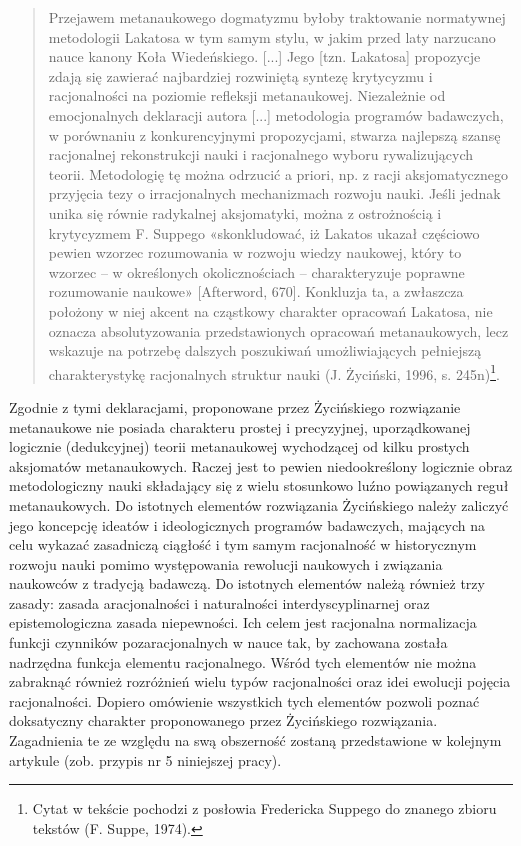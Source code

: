 \documentclass{article}
\begin{document}
\begin{quotation}
Przejawem metanaukowego dogmatyzmu byłoby traktowanie normatywnej metodologii Lakatosa w tym samym stylu, w jakim przed
laty narzucano nauce kanony Koła Wiedeńskiego. [...] Jego [tzn. Lakatosa] propozycje zdają się zawierać najbardziej
rozwiniętą syntezę krytycyzmu i racjonalności na poziomie refleksji metanaukowej. Niezależnie od emocjonalnych
deklaracji autora [...] metodologia programów badawczych, w porównaniu z konkurencyjnymi propozycjami, stwarza
najlepszą szansę racjonalnej rekonstrukcji nauki i racjonalnego wyboru rywalizujących teorii. Metodologię tę można
odrzucić a priori, np. z racji aksjomatycznego przyjęcia tezy o irracjonalnych mechanizmach rozwoju nauki. Jeśli jednak
unika się równie radykalnej aksjomatyki, można z ostrożnością i krytycyzmem F. Suppego «skonkludować, iż Lakatos ukazał
częściowo pewien wzorzec rozumowania w rozwoju wiedzy naukowej, który to wzorzec – w określonych okolicznościach –
charakteryzuje poprawne rozumowanie naukowe» [Afterword, 670]. Konkluzja ta, a zwłaszcza położony w niej akcent na
cząstkowy charakter opracowań Lakatosa, nie oznacza absolutyzowania przedstawionych opracowań metanaukowych, lecz
wskazuje na potrzebę dalszych poszukiwań umożliwiających pełniejszą charakterystykę racjonalnych struktur nauki
\label{ref:RND6tjtqNjtZ0}(J. Życiński, 1996, s. 245n)\footnote{Cytat w tekście pochodzi z posłowia Fredericka Suppego
do znanego zbioru tekstów \label{ref:RNDtowH5ssMQB}(F. Suppe, 1974).}.

\end{quotation}
Zgodnie z tymi deklaracjami, proponowane przez Życińskiego rozwiązanie metanaukowe nie posiada charakteru  prostej i
precyzyjnej, uporządkowanej logicznie (dedukcyjnej) teorii metanaukowej wychodzącej od kilku prostych aksjomatów
metanaukowych. Raczej jest to pewien niedookreślony logicznie obraz metodologiczny nauki składający się z wielu
stosunkowo luźno powiązanych reguł metanaukowych. Do istotnych elementów rozwiązania Życińskiego należy zaliczyć jego
koncepcję ideatów i ideologicznych programów badawczych, mających na celu wykazać zasadniczą ciągłość i tym samym
racjonalność w historycznym rozwoju nauki pomimo występowania rewolucji naukowych i związania naukowców z tradycją
badawczą. Do istotnych elementów należą również trzy zasady: zasada aracjonalności i naturalności interdyscyplinarnej
oraz epistemologiczna zasada niepewności. Ich celem jest racjonalna normalizacja funkcji czynników pozaracjonalnych w
nauce tak, by zachowana została nadrzędna funkcja elementu racjonalnego. Wśród tych elementów nie można zabraknąć
również rozróżnień wielu typów racjonalności oraz idei ewolucji pojęcia racjonalności. Dopiero omówienie wszystkich
tych elementów pozwoli poznać doksatyczny charakter proponowanego przez Życińskiego rozwiązania. Zagadnienia te ze
względu na swą obszerność zostaną przedstawione w kolejnym artykule (zob. przypis nr 5 niniejszej pracy).
\end{document}
